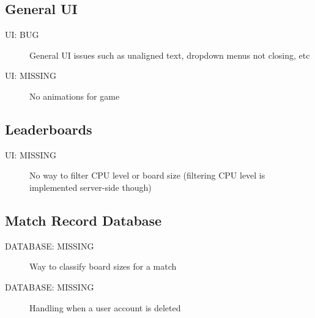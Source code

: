 \documentclass{article}
\begin{document}
\subsection{General UI}

\begin{description}
  \item[UI: BUG] General UI issues such as unaligned text, dropdown menus not closing, etc
  \item[UI: MISSING] No animations for game
\end{description}

\subsection{Leaderboards}

\begin{description}
  \item[UI: MISSING] No way to filter CPU level or board size (filtering CPU level is implemented server-side though)
\end{description}

\subsection{Match Record Database}

\begin{description}
  \item[DATABASE: MISSING] Way to classify board sizes for a match
  \item[DATABASE: MISSING] Handling when a user account is deleted
\end{description}
\end{document}
